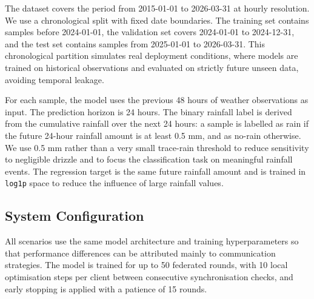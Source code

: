 \documentclass[conference]{IEEEtran}
\begin{document}
The dataset covers the period from 2015-01-01 to 2026-03-31 at hourly resolution. We use a chronological split with fixed date boundaries. The training set contains samples before 2024-01-01, the validation set covers 2024-01-01 to 2024-12-31, and the test set contains samples from 2025-01-01 to 2026-03-31. This chronological partition simulates real deployment conditions, where models are trained on historical observations and evaluated on strictly future unseen data, avoiding temporal leakage.

For each sample, the model uses the previous 48 hours of weather observations as input. The prediction horizon is 24 hours. The binary rainfall label is derived from the cumulative rainfall over the next 24 hours: a sample is labelled as rain if the future 24-hour rainfall amount is at least 0.5 mm, and as no-rain otherwise. We use 0.5 mm rather than a very small trace-rain threshold to reduce sensitivity to negligible drizzle and to focus the classification task on meaningful rainfall events. The regression target is the same future rainfall amount and is trained in \texttt{log1p} space to reduce the influence of large rainfall values.

\begin{table}[H]
\centering
\caption{Chronological data split used in the experiments.}
\label{tab:data_split}
\end{table}

\subsection{System Configuration}
\label{subsec:system_configuration}

All scenarios use the same model architecture and training hyperparameters so that performance differences can be attributed mainly to communication strategies. The model is trained for up to 50 federated rounds, with 10 local optimisation steps per client between consecutive synchronisation checks, and early stopping is applied with a patience of 15 rounds.
\end{document}
